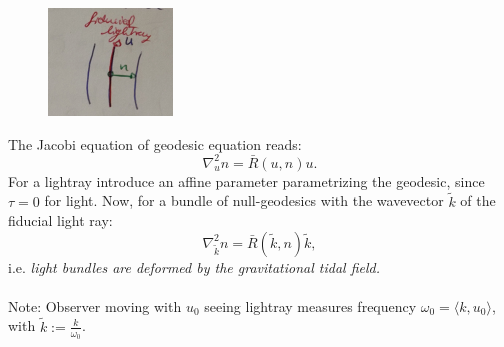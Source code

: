 \begin{figure}
	\centering
	\includegraphics[width=0.7\linewidth]{gfx/gravlensingLightcongruence}
	\caption{}
	\label{fig:gravlensinglightcongruence}
\end{figure}
	The Jacobi equation of geodesic equation reads:
	\begin{equation}
		\nabla^2_u n = \bar{R}(u,n)u.
	\end{equation}
	For a lightray introduce an affine parameter parametrizing the geodesic, since $\tau=0$ for light. Now, for a bundle of null-geodesics with the wavevector $\tilde{k}$ of the fiducial light ray:
	\begin{equation}
		\nabla^2_{\tilde{k}} n = \bar{R}(\tilde{k},n)\tilde{k},
	\end{equation}
	i.e. \emph{light bundles are deformed by the gravitational tidal field.}\\
	\\
	Note: Observer moving with $u_0$ seeing lightray measures frequency $\omega_0=\langle k, u_0 \rangle$, with $\tilde{k}:= \frac{k}{\omega_0}$.\\
	\\
